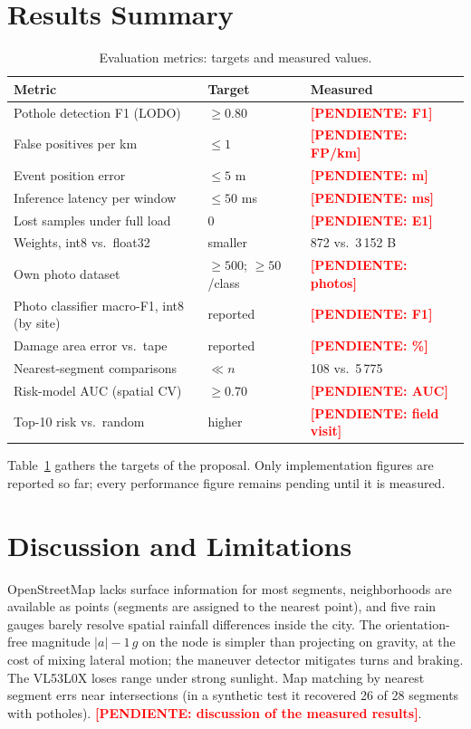 \documentclass[journal,10pt]{IEEEtran}
\newcommand{\pendiente}[1]{\textcolor{red}{\textbf{[PENDIENTE: #1]}}}
\begin{document}
\section{Results Summary}
\begin{table}[!t]
\centering
\caption{Evaluation metrics: targets and measured values.}
\label{tab:metrics}
\footnotesize
\begin{tabularx}{\columnwidth}{@{}>{\raggedright\arraybackslash}X l l@{}}
\toprule
\textbf{Metric} & \textbf{Target} & \textbf{Measured} \\
\midrule
Pothole detection F1 (LODO) & \(\geq 0.80\) & \pendiente{F1} \\
False positives per km & \(\leq 1\) & \pendiente{FP/km} \\
Event position error & \(\leq 5\) m & \pendiente{m} \\
Inference latency per window & \(\leq 50\) ms & \pendiente{ms} \\
Lost samples under full load & 0 & \pendiente{E1} \\
Weights, int8 vs.\ float32 & smaller & 872 vs.\ 3\,152 B \\
Own photo dataset & \(\geq 500\); \(\geq 50\)/class & \pendiente{photos} \\
Photo classifier macro-F1, int8 (by site) & reported & \pendiente{F1} \\
Damage area error vs.\ tape & reported & \pendiente{\%} \\
Nearest-segment comparisons & \(\ll n\) & 108 vs.\ 5\,775 \\
Risk-model AUC (spatial CV) & \(\geq 0.70\) & \pendiente{AUC} \\
Top-10 risk vs.\ random & higher & \pendiente{field visit} \\
\bottomrule
\end{tabularx}
\end{table}
Table~\ref{tab:metrics} gathers the targets of the proposal. Only implementation figures are reported so far; every performance figure remains pending until it is measured.

\section{Discussion and Limitations}
OpenStreetMap lacks surface information for most segments, neighborhoods are available as points (segments are assigned to the nearest point), and five rain gauges barely resolve spatial rainfall differences inside the city. The orientation-free magnitude \(|a|-1\,g\) on the node is simpler than projecting on gravity, at the cost of mixing lateral motion; the maneuver detector mitigates turns and braking. The VL53L0X loses range under strong sunlight. Map matching by nearest segment errs near intersections (in a synthetic test it recovered 26 of 28 segments with potholes). \pendiente{discussion of the measured results}.
\end{document}
